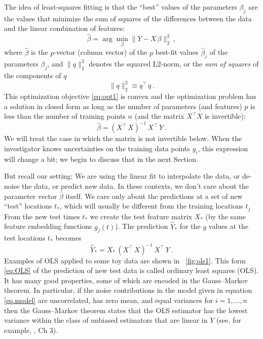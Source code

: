 \documentclass[12pt,letterpaper]{article}
\newcommand{\sectionname}{Section}
\begin{document}
The idea of least-squares fitting is that the ``best'' values of the parameters $\beta_j$ are the values that minimize the sum of squares of the differences between the data and the linear combination of features:
\begin{equation}\label{eq:opt1}
    \hat{\beta} = \arg\min_\beta \|Y - X\,\beta\|_2^2
    ~,
\end{equation}
where $\hat{\beta}$ is the $p$-vector (column vector) of the $p$ best-fit values $\hat{\beta}_j$ of the parameters $\beta_j$, and $\|q\|_2^2$ denotes the squared L2-norm, or the \emph{sum of squares} of the components of $q$
\begin{equation}
    \|q\|_2^2 \equiv q^\top\,q
    ~.
\end{equation}
This optimization objective \eqref{eq:opt1} is convex and the optimization problem has a solution in closed form as long as the number of parameters (and features) $p$ is less than the number of training points $n$ (and the matrix $X^\top X$ is invertible):
\begin{equation}
    \hat{\beta} = (X^\top\,X)^{-1}\,X^\top\,Y
    ~.
\end{equation}
We will treat the case in which the matrix is not invertible below.
When the investigator knows uncertainties on the training data points $y_i$, this expression will change a bit; we begin to discuss that in the next \sectionname.

But recall our setting:
We are using the linear fit to interpolate the data, or de-noise the data, or predict new data.
In these contexts, we don't care about the parameter vector $\hat{\beta}$ itself.
We care only about the predictions at a set of new ``test'' locations $t_\ast$, which will usually be different from the training locations $t_j$
From the new test times $t_\ast$ we create the test feature matrix $X_\ast$ (by the same feature embedding functions $g_j(t)$).
The prediction $\hat{Y}_\ast$ for the $y$ values at the test locations $t_\ast$ becomes
\begin{equation}\label{eq:OLS}
    \hat{Y}_\ast = X_\ast\,(X^\top\,X)^{-1}\,X^\top\,Y
    ~.
\end{equation}
Examples of OLS applied to some toy data are shown in \figurename~\ref{fig:ols1}.
This form \eqref{eq:OLS} of the prediction of new test data is called ordinary least squares (OLS). It has many good properties, some of which are encoded in the Gauss--Markov theorem.
In particular, if the noise contributions in the model given in equation \eqref{eq.model} are uncorrelated, has zero mean, and equal variances for $i=1,\ldots, n$ then the Gauss--Markov theorem states that the OLS estimator has the lowest variance within the class of unbiased estimators that are linear in $Y$ (see, for example, \citealt{esl}, Ch 3).
\end{document}
